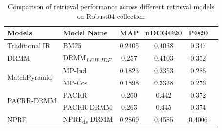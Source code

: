 \begin{table}[]
    \centering
    \begin{tabular}{llcccc}
        \toprule
         Models & Model Name & MAP & nDCG@20 & P@20\\
         \midrule
         Traditional IR & BM25 & 0.2405 & 0.4038 & 0.347\\ 
         \cmidrule(lr){1-5}
         
         \multirow{1}{*}{DRMM} & DRMM\textsubscript{\textit{LCH}x\textit{IDF}} & 0.257 & 0.4103 & 0.352 \\
         \cmidrule(lr){1-5}
         
         \multirow{2}{*}{MatchPyramid} & MP-Ind & 0.1823 & 0.3353 & 0.286\\
         & MP-Cos & 0.1898 & 0.3328 & 0.276\\
         \cmidrule(lr){1-5}
         
         \multirow{2}{*}{PACRR-DRMM} & PACRR & 0.260 & 0.442 & 0.372\\
         & PACRR-DRMM & 0.263 & 0.445 & 0.374 \\
         \cmidrule(lr){1-5}
         
         \multirow{1}{*}{NPRF} & NPRF\textsubscript{ds}-DRMM & 0.2869 & 0.4585 & 0.4006 \\
         \bottomrule
    \end{tabular}
    \caption{Comparison of retrieval performance across different retrieval models on Robust04 collection}
    \label{tab:comparison_all_model_eval}
\end{table}

